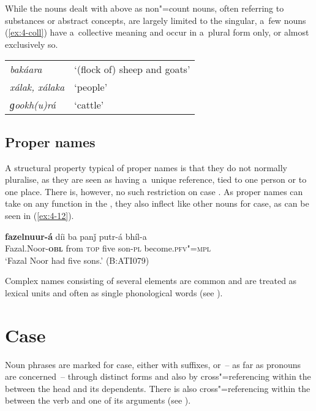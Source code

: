 While the nouns dealt with above as non"=count nouns, often referring to substances or abstract concepts, are largely limited to the singular, a~few nouns (\ref{ex:4-coll}) have a~collective meaning and occur in a~plural form only, or almost exclusively so.


\begin{exe}
\extab
\label{ex:4-coll}
\begin{tabularx}{\textwidth}{ l@{\hspace{40pt}} Q }
\textit{bakáara} &
`(flock of) sheep and goats'\\
\textit{xálak, xálaka} &
`people'\\
\textit{ɡookh(u)rá} &
`cattle'\\
\end{tabularx}
\end{exe}

\subsection{Proper names}
\label{subsec:4-4-3}

A structural property typical of proper names is that they do not normally pluralise, as they are seen as having a~unique reference, tied to one person or to one place. There is, however, no such restriction on case . As proper names can take on any function in the , they also inflect like other nouns for case, as can be seen in (\ref{ex:4-12}).

\begin{exe}
\ex
\label{ex:4-12}
\gll \textbf{fazelnuur-á} díi ba panǰ putr-á bhíl-a \\
	Fazal.Noor-\textbf{\textsc{obl}} from \textsc{top} five son-\textsc{pl} become.\textsc{pfv"=mpl} \\
\glt `Fazal Noor had five sons.' (B:ATI079)
\end{exe}

Complex names consisting of several elements are common and are treated as lexical units and often as single phonological words (see ).

\section{Case}
\label{sec:4-5}

Noun phrases are marked for case, either with  suffixes, or~-- as far as pronouns are concerned~-- through distinct forms and also by cross"=referencing within the   between the  head and its dependents. There is also cross"=referencing within the  between the verb and one of its arguments (see ).


